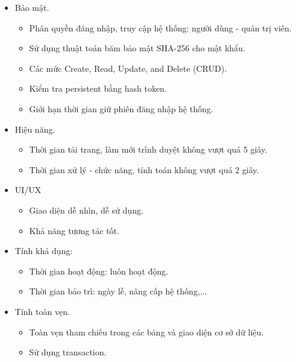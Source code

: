 \begin{itemize}
    \item Bảo mật.
    \begin{itemize}
        \item Phân quyền đăng nhập, truy cập hệ thống: người dùng - quản trị viên.
        \item Sử dụng thuật toán băm bảo mật SHA-256 cho mật khẩu.
        \item Các mức Create, Read, Update, and Delete (CRUD).
        \item Kiểm tra persistent bằng hash token.
        \item Giới hạn thời gian giữ phiên đăng nhập hệ thống.
    \end{itemize}
    \item Hiệu năng.
    \begin{itemize}
        \item Thời gian tải trang, làm mới trình duyệt không vượt quá 5 giây.
        \item Thời gian xử lý - chức năng, tính toán không vượt quá 2 giây.
    \end{itemize}
    \item UI/UX
    \begin{itemize}
        \item Giao diện dễ nhìn, dễ sử dụng.
        \item Khả năng tương tác tốt.
    \end{itemize}
    \item Tính khả dụng:  
    \begin{itemize}
        \item Thời gian hoạt động: luôn hoạt động.
        \item Thời gian bảo trì: ngày lễ, nâng cấp hệ thống,...
    \end{itemize}
    \item Tính toàn vẹn.
    \begin{itemize}
        \item Toàn vẹn tham chiếu trong các bảng và giao diện cơ sở dữ liệu.
        \item Sử dụng transaction.
    \end{itemize}
\end{itemize}